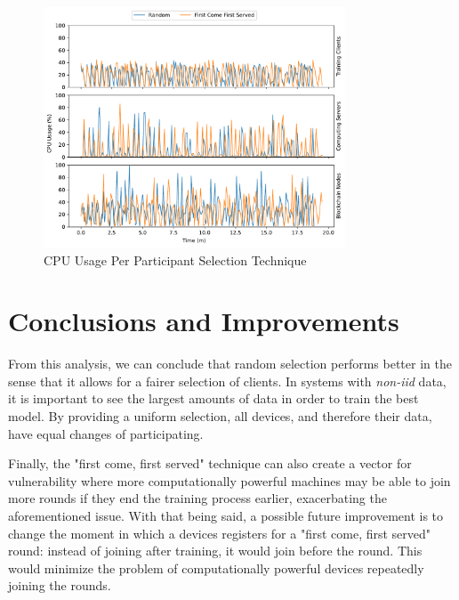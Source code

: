 \begin{figure}[!hpb]
    \centering
    \centering
    \includegraphics[width=0.8\textwidth]{graphics/selection/cpu.pdf}
    \caption{CPU Usage Per Participant Selection Technique}
    \label{fig:cpu_selection}
\end{figure}

\section{Conclusions and Improvements}

From this analysis, we can conclude that random selection performs better in the sense that it allows for a fairer selection of clients. In systems with \textit{non-iid} data, it is important to see the largest amounts of data in order to train the best model. By providing a uniform selection, all devices, and therefore their data, have equal changes of participating.

Finally, the "first come, first served" technique can also create a vector for vulnerability where more computationally powerful machines may be able to join more rounds if they end the training process earlier, exacerbating the aforementioned issue. With that being said, a possible future improvement is to change the moment in which a devices registers for a "first come, first served" round: instead of joining after training, it would join before the round. This would minimize the problem of computationally powerful devices repeatedly joining the rounds. %
